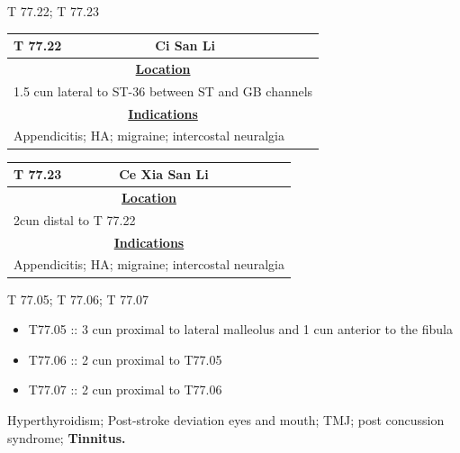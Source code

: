 \begin{frame}{T 77.22; T 77.23}

\begin{table}[]
\begin{tabular}{ll}
T 77.22                           & Ci San Li                           \\ \hline
\multicolumn{2}{c}{{\ul \textbf{Location}}}                             \\
\multicolumn{2}{l}{1.5 cun lateral to ST-36 between ST and GB channels} \\ \hline
\multicolumn{2}{c}{{\ul \textbf{Indications}}}                          \\
\multicolumn{2}{l}{Appendicitis; HA; migraine; intercostal neuralgia}   \\ \hline
\end{tabular}
\end{table}

\begin{table}[]
\begin{tabular}{ll}
T 77.23                         & Ce Xia San Li                       \\ \hline
\multicolumn{2}{c}{{\ul \textbf{Location}}}                           \\
\multicolumn{2}{l}{2cun distal to T 77.22}                            \\ \hline
\multicolumn{2}{c}{{\ul \textbf{Indications}}}                        \\
\multicolumn{2}{l}{Appendicitis; HA; migraine; intercostal neuralgia} \\ \hline
\end{tabular}
\end{table}

\end{frame}

\begin{frame}{T 77.05; T 77.06; T 77.07}



\begin{itemize}
\item T77.05 :: 3 cun proximal to lateral malleolus and 1 cun anterior to the fibula
\item T77.06 :: 2 cun proximal to T77.05
\item T77.07 :: 2 cun proximal to T77.06
\end{itemize}

Hyperthyroidism; Post-stroke deviation eyes and mouth; TMJ; post concussion syndrome; \textbf{Tinnitus.}

\end{frame}

